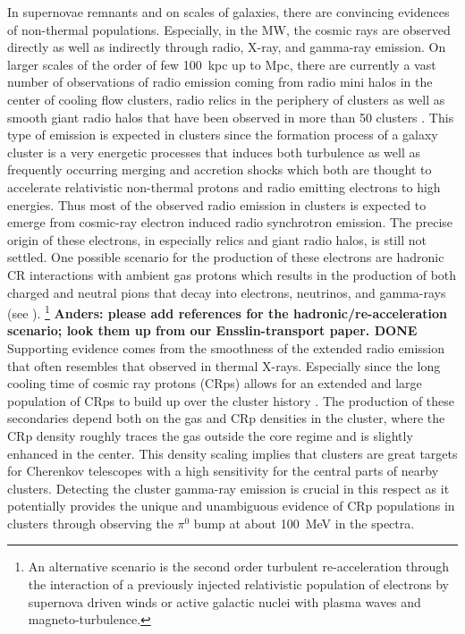 \documentclass[10pt,aps,pra,reprint,amsmath,amsfonts,amssymb,showpacs,nofootinbib,floatfix]{revtex4-1}
\begin{document}
In supernovae remnants and on scales of galaxies, there are convincing
evidences of non-thermal populations. Especially, in the MW, the
cosmic rays are observed directly as well as indirectly through radio,
X-ray, and gamma-ray emission. On larger scales of the order of few
100~kpc up to Mpc, there are currently a vast number of observations
of radio emission coming from radio mini halos in the center of
cooling flow clusters, radio relics in the periphery of clusters
\cite{2004rcfg.proc..335K} as well as smooth giant radio halos that
have been observed in more than 50 clusters
\cite{2003ASPC..301..143F,2008SSRv..134...93F}. This type of emission
is expected in clusters since the formation process of a galaxy
cluster is a very energetic processes that induces both turbulence as
well as frequently occurring merging and accretion shocks which both
are thought to accelerate relativistic non-thermal protons and radio
emitting electrons to high energies. Thus most of the observed radio
emission in clusters is expected to emerge from cosmic-ray electron
induced radio synchrotron emission. The precise origin of these
electrons, in especially relics and giant radio halos, is still not
settled. One possible scenario for the production of these electrons
are hadronic CR interactions with ambient gas protons which results in
the production of both charged and neutral pions that decay into
electrons, neutrinos, and gamma-rays (see
\cite{1980ApJ...239L..93D,1982AJ.....87.1266V,1999APh....12..169B,2000A&A...362..151D,2001ApJ...559...59M,2003MNRAS.342.1009M,2004A&A...413...17P,2004MNRAS.352...76P,2008MNRAS.385.1211P,2008MNRAS.385.1242P,2009JCAP...09..024K,2010MNRAS.401...47D,2010MNRAS.407.1565D,2010ApJ...722..737K,2010arXiv1011.0729K,2011A&A...527A..99E}
). \footnote{An alternative scenario is the second order turbulent
  re-acceleration through the interaction of a previously injected
  relativistic population of electrons by supernova driven winds or
  active galactic nuclei with plasma waves and
  magneto-turbulence.\cite{1987A&A...182...21S,1993ApJ...406..399G,2004MNRAS.350.1174B,2005MNRAS.363.1173B,2007MNRAS.378..245B,2011MNRAS.410..127B,2009A&A...507..661B}}
     {\bf Anders: please add references for the
       hadronic/re-acceleration scenario; look them up from our
       Ensslin-transport paper. DONE} Supporting evidence comes from
     the smoothness of the extended radio emission that often
     resembles that observed in thermal X-rays. Especially since the
     long cooling time of cosmic ray protons (CRps) allows for an
     extended and large population of CRps to build up over the
     cluster history \citep{1996SSRv...75..279V, 1997ApJ...477..560E,
       1997ApJ...487..529B}. The production of these secondaries
     depend both on the gas and CRp densities in the cluster, where
     the CRp density roughly traces the gas outside the core regime
     and is slightly enhanced in the center.  This density scaling
     implies that clusters are great targets for Cherenkov telescopes
     with a high sensitivity for the central parts of nearby
     clusters. Detecting the cluster gamma-ray emission is crucial in
     this respect as it potentially provides the unique and
     unambiguous evidence of CRp populations in clusters through
     observing the $\pi^0$ bump at about 100~MeV in the spectra.
\end{document}
